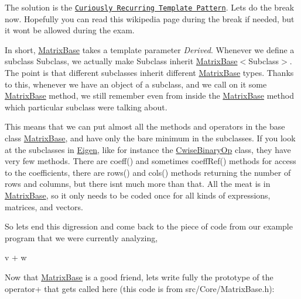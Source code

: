 The solution is the \href{http://en.wikipedia.org/wiki/Curiously_Recurring_Template_Pattern}{\tt Curiously Recurring Template Pattern}. Let\textquotesingle{}s do the break now. Hopefully you can read this wikipedia page during the break if needed, but it won\textquotesingle{}t be allowed during the exam.

In short, \hyperlink{group___core___module_class_eigen_1_1_matrix_base}{Matrix\+Base} takes a template parameter {\itshape Derived}. Whenever we define a subclass Subclass, we actually make Subclass inherit \hyperlink{group___core___module_class_eigen_1_1_matrix_base}{Matrix\+Base}$<$Subclass$>$. The point is that different subclasses inherit different \hyperlink{group___core___module_class_eigen_1_1_matrix_base}{Matrix\+Base} types. Thanks to this, whenever we have an object of a subclass, and we call on it some \hyperlink{group___core___module_class_eigen_1_1_matrix_base}{Matrix\+Base} method, we still remember even from inside the \hyperlink{group___core___module_class_eigen_1_1_matrix_base}{Matrix\+Base} method which particular subclass we\textquotesingle{}re talking about.

This means that we can put almost all the methods and operators in the base class \hyperlink{group___core___module_class_eigen_1_1_matrix_base}{Matrix\+Base}, and have only the bare minimum in the subclasses. If you look at the subclasses in \hyperlink{namespace_eigen}{Eigen}, like for instance the \hyperlink{group___core___module_class_eigen_1_1_cwise_binary_op}{Cwise\+Binary\+Op} class, they have very few methods. There are coeff() and sometimes coeff\+Ref() methods for access to the coefficients, there are rows() and cols() methods returning the number of rows and columns, but there isn\textquotesingle{}t much more than that. All the meat is in \hyperlink{group___core___module_class_eigen_1_1_matrix_base}{Matrix\+Base}, so it only needs to be coded once for all kinds of expressions, matrices, and vectors.

So let\textquotesingle{}s end this digression and come back to the piece of code from our example program that we were currently analyzing,


\begin{DoxyCode}
v + w
\end{DoxyCode}


Now that \hyperlink{group___core___module_class_eigen_1_1_matrix_base}{Matrix\+Base} is a good friend, let\textquotesingle{}s write fully the prototype of the operator+ that gets called here (this code is from src/\+Core/\+Matrix\+Base.\+h)\+:


